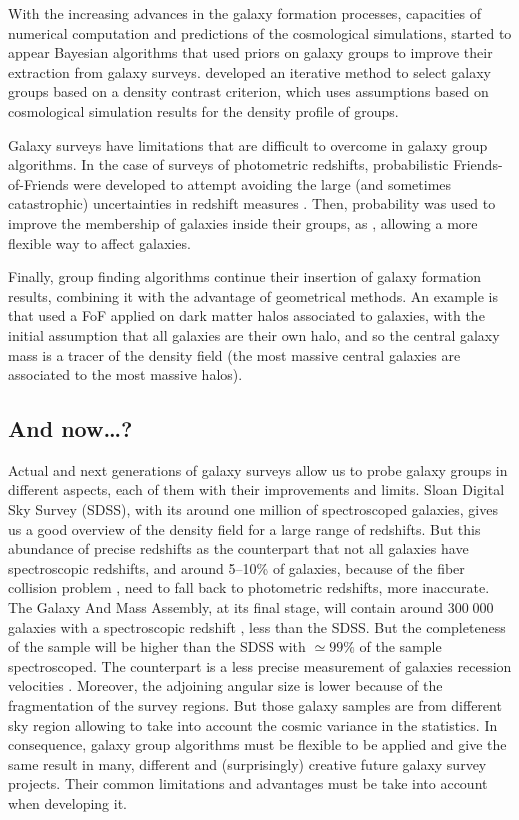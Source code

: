 With the increasing advances in the galaxy formation processes, capacities
of numerical computation and predictions of the cosmological simulations,
started to appear Bayesian algorithms that used priors on galaxy groups to
improve their extraction from galaxy surveys. \citet{Yang+05,Yang+07}
developed an iterative method to select galaxy groups based on a density
contrast criterion, which uses assumptions based on cosmological simulation
results for the density profile of groups.

Galaxy surveys have limitations that are difficult to overcome in galaxy
group algorithms. In the case of surveys of photometric redshifts,
probabilistic Friends-of-Friends were developed to attempt avoiding the
large (and sometimes catastrophic) uncertainties in redshift measures
\citep{Liu+08}. Then, probability was used to improve the membership of
galaxies inside their groups, as \citet{DominguezRomero+12}, allowing a more
flexible way to affect galaxies.

Finally, group finding algorithms continue their insertion of galaxy
formation results, combining it with the advantage of geometrical methods.
An example is \citet{MunozCuartas+12} that used a FoF applied on dark matter
halos associated to galaxies, with the initial assumption that all galaxies
are their own halo, and so the central galaxy mass is a tracer of the
density field (the most massive central galaxies are associated to the most
massive halos).

\subsection{And now\ldots?}
\label{sub:and_now}

Actual and next generations of galaxy surveys allow us to probe galaxy
groups in different aspects, each of them with their improvements and
limits. Sloan Digital Sky Survey (SDSS), with its around one million of
spectroscoped galaxies, gives us a good overview of the density field for a
large range of redshifts. But this abundance of precise redshifts as the
counterpart that not all galaxies have spectroscopic redshifts, and around
5--10\% of galaxies, because of the fiber collision problem
\citep{Blanton+03}, need to fall back to photometric redshifts, more
inaccurate. The Galaxy And Mass Assembly, at its final stage, will contain
around $300\;000$ galaxies with a spectroscopic redshift \citep{Hopkins+13},
less than the SDSS\@. But the completeness of the sample will be higher than
the SDSS with $\simeq99\%$ of the sample spectroscoped. The counterpart is a
less precise measurement of galaxies recession velocities
\citep{Robotham+11,Hopkins+13}. Moreover, the adjoining angular size is
lower because of the fragmentation of the survey regions. But those galaxy
samples are from different sky region allowing to take into account the
cosmic variance in the statistics.
%
In consequence, galaxy group algorithms must be flexible to be applied and
give the same result in many, different and (surprisingly) creative future
galaxy survey projects. Their common limitations and advantages must be take
into account when developing it.

